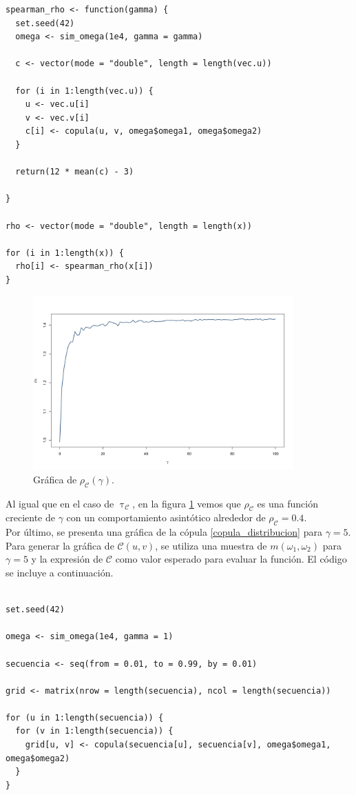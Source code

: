 \documentclass[11pt,a4paper]{article}
\newcommand{\C}{\mathcal{C}}
\begin{document}
\begin{lstlisting}
spearman_rho <- function(gamma) {
  set.seed(42)
  omega <- sim_omega(1e4, gamma = gamma)
  
  c <- vector(mode = "double", length = length(vec.u))
  
  for (i in 1:length(vec.u)) {
    u <- vec.u[i]
    v <- vec.v[i]
    c[i] <- copula(u, v, omega$omega1, omega$omega2)
  }
  
  return(12 * mean(c) - 3)
  
}

rho <- vector(mode = "double", length = length(x))

for (i in 1:length(x)) {
  rho[i] <- spearman_rho(x[i])
}
\end{lstlisting}

\begin{figure}[H]
\centering\includegraphics[width=10cm]{spearman_rho.png}
\caption{Gráfica de $\rho_\C (\gamma)$.}
\label{fig:spearman_rho}
\end{figure}

Al igual que en el caso de $\uptau_\C$, en la figura \ref{fig:spearman_rho} vemos que $\rho_\C$ es una función creciente de $\gamma$ con un comportamiento asintótico alrededor de $\rho_\C = 0.4$.\\

Por último, se presenta una gráfica de la cópula \eqref{copula_distribucion} para $\gamma = 5$. Para generar la gráfica de $\C(u, v)$, se utiliza una muestra de $m(\omega_1, \omega_2)$ para $\gamma = 5$ y la expresión de $\C$ como valor esperado para evaluar la función. El código se incluye a continuación.\\


\begin{lstlisting}

set.seed(42)

omega <- sim_omega(1e4, gamma = 1)

secuencia <- seq(from = 0.01, to = 0.99, by = 0.01)

grid <- matrix(nrow = length(secuencia), ncol = length(secuencia))

for (u in 1:length(secuencia)) {
  for (v in 1:length(secuencia)) {
    grid[u, v] <- copula(secuencia[u], secuencia[v], omega$omega1, omega$omega2)
  }
}
  
\end{lstlisting}
\end{document}
